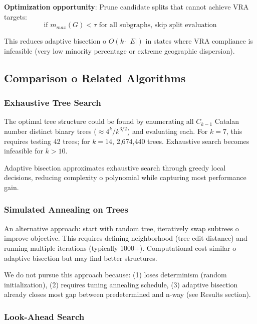\textbf{Optimization opportunity}: Prune candidate splits that cannot achieve VRA targets:
\begin{equation}
\text{if } m_{max}(G) < \tau \text{ for all subgraphs, skip split evaluation}
\end{equation}

This reduces adaptive bisection 	o $O(k \cdot |E|)$ in states where VRA compliance is infeasible (very low minority percentage or extreme geographic dispersion).

\subsection{Comparison 	o Related Algorithms}

\subsubsection{Exhaustive Tree Search}

The optimal tree structure could be found by enumerating all $C_{k-1}$ Catalan number distinct binary trees ($\approx 4^k / k^{3/2}$) and evaluating each. For $k=7$, this requires testing 42 trees; for $k=14$, 2,674,440 trees. Exhaustive search becomes infeasible for $k > 10$.

Adaptive bisection approximates exhaustive search through greedy local decisions, reducing complexity 	o polynomial while capturing most performance gain.

\subsubsection{Simulated Annealing on Trees}

An alternative approach: start with random tree, iteratively swap subtrees 	o improve objective. This requires defining neighborhood (tree edit distance) and running multiple iterations (typically 1000+). Computational cost similar 	o adaptive bisection but may find better structures.

We do not pursue this approach because: (1) loses determinism (random initialization), (2) requires tuning annealing schedule, (3) adaptive bisection already closes most gap between predetermined and n-way (see Results section).

\subsubsection{Look-Ahead Search}

